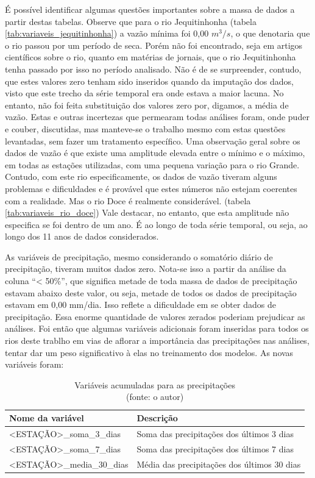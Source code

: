 É possível identificar algumas questões importantes sobre a massa de dados a partir destas tabelas. Observe que para o rio Jequitinhonha (tabela \ref{tab:variaveis_jequitinhonha}) a vazão mínima foi 0,00 $m^3/s$, o que denotaria que o rio passou por um período de seca. Porém não foi encontrado, seja em artigos científicos sobre o rio, quanto em matérias de jornais, que o rio Jequitinhonha tenha passado por isso no período analisado. Não é de se surpreender, contudo, que estes valores zero tenham sido inseridos quando da imputação dos dados, visto que este trecho da série temporal era onde estava a maior lacuna. No entanto, não foi feita substituição dos valores zero por, digamos, a média de vazão. Estas e outras incertezas que permearam todas análises foram, onde puder e couber, discutidas, mas manteve-se o trabalho mesmo com estas questões levantadas, sem fazer um tratamento específico. Uma observação geral sobre os dados de vazão é que existe uma amplitude elevada entre o mínimo e o máximo, em todas as estações utilizadas, com uma pequena variação para o rio Grande. Contudo, com este rio especificamente, os dados de vazão tiveram alguns problemas e dificuldades e é provável que estes números não estejam coerentes com a realidade. Mas o rio Doce é realmente considerável. (tabela \ref{tab:variaveis_rio_doce}) Vale destacar, no entanto, que esta amplitude não especifica se foi dentro de um ano. É ao longo de toda série temporal, ou seja, ao longo dos 11 anos de dados considerados.

As variáveis de precipitação, mesmo considerando o somatório diário de precipitação, tiveram muitos dados zero. Nota-se isso a partir da análise da coluna ``< 50\%'', que significa metade de toda massa de dados de precipitação estavam abaixo deste valor, ou seja, metade de todos os dados de precipitação estavam em 0,00 mm/dia. Isso reflete a dificuldade em se obter dados de precipitação. Essa enorme quantidade de valores zerados poderiam prejudicar as análises. Foi então que algumas variáveis adicionais foram inseridas para todos os rios deste trablho em vias de aflorar a importância das precipitações nas análises, tentar dar um peso significativo à elas no treinamento dos modelos. As novas variáveis foram:

\begin{table}[!h]
	\centering \small
	\caption{Variáveis acumuladas para as precipitações \\(fonte: o autor)}
	\begin{tabular}{|l|l|} \hline 
		\textbf{Nome da variável}    & \textbf{Descrição}                          \\\hline
		<ESTAÇÃO>\_soma\_3\_dias     & Soma das precipitações dos últimos 3 dias   \\\hline
		<ESTAÇÃO>\_soma\_7\_dias     & Soma das precipitações dos últimos 7 dias   \\\hline
		<ESTAÇÃO>\_media\_30\_dias   & Média das precipitações dos últimos 30 dias \\\hline
	\end{tabular}
	\label{tab:variaveis_acumuladas}
\end{table}

